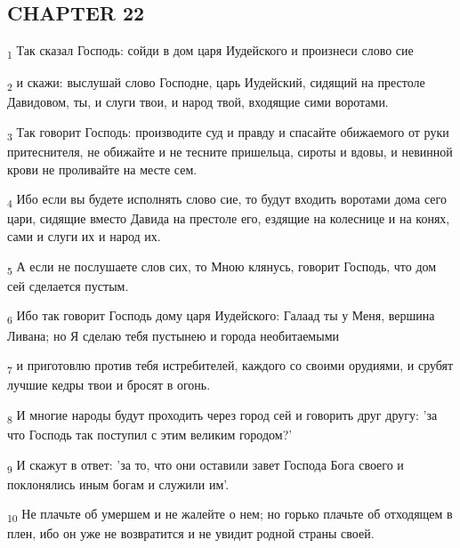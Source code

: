 \subsection{CHAPTER 22}
\begin{tcolorbox}
\textsubscript{1} Так сказал Господь: сойди в дом царя Иудейского и произнеси слово сие
\end{tcolorbox}
\begin{tcolorbox}
\textsubscript{2} и скажи: выслушай слово Господне, царь Иудейский, сидящий на престоле Давидовом, ты, и слуги твои, и народ твой, входящие сими воротами.
\end{tcolorbox}
\begin{tcolorbox}
\textsubscript{3} Так говорит Господь: производите суд и правду и спасайте обижаемого от руки притеснителя, не обижайте и не тесните пришельца, сироты и вдовы, и невинной крови не проливайте на месте сем.
\end{tcolorbox}
\begin{tcolorbox}
\textsubscript{4} Ибо если вы будете исполнять слово сие, то будут входить воротами дома сего цари, сидящие вместо Давида на престоле его, ездящие на колеснице и на конях, сами и слуги их и народ их.
\end{tcolorbox}
\begin{tcolorbox}
\textsubscript{5} А если не послушаете слов сих, то Мною клянусь, говорит Господь, что дом сей сделается пустым.
\end{tcolorbox}
\begin{tcolorbox}
\textsubscript{6} Ибо так говорит Господь дому царя Иудейского: Галаад ты у Меня, вершина Ливана; но Я сделаю тебя пустынею и города необитаемыми
\end{tcolorbox}
\begin{tcolorbox}
\textsubscript{7} и приготовлю против тебя истребителей, каждого со своими орудиями, и срубят лучшие кедры твои и бросят в огонь.
\end{tcolorbox}
\begin{tcolorbox}
\textsubscript{8} И многие народы будут проходить через город сей и говорить друг другу: 'за что Господь так поступил с этим великим городом?'
\end{tcolorbox}
\begin{tcolorbox}
\textsubscript{9} И скажут в ответ: 'за то, что они оставили завет Господа Бога своего и поклонялись иным богам и служили им'.
\end{tcolorbox}
\begin{tcolorbox}
\textsubscript{10} Не плачьте об умершем и не жалейте о нем; но горько плачьте об отходящем в плен, ибо он уже не возвратится и не увидит родной страны своей.
\end{tcolorbox}
